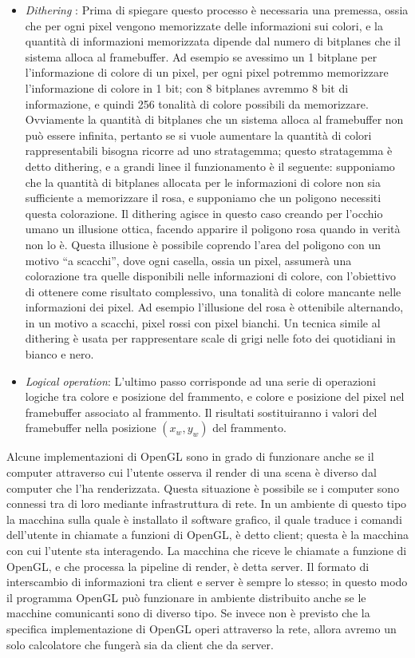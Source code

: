 \begin{itemize}
\item \emph{Dithering} : Prima di spiegare questo processo è necessaria una premessa, ossia che per ogni pixel vengono memorizzate delle informazioni sui colori, e la quantità di informazioni memorizzata dipende dal numero di bitplanes che il sistema alloca al framebuffer. Ad esempio se avessimo un 1 bitplane per l’informazione di colore di un pixel, per ogni pixel potremmo memorizzare l’informazione di colore in 1 bit; con 8 bitplanes avremmo 8 bit di informazione, e quindi 256 tonalità di colore possibili da memorizzare. Ovviamente la quantità di bitplanes che un sistema alloca al framebuffer non può essere infinita, pertanto se si vuole aumentare la quantità di colori rappresentabili bisogna ricorre ad uno stratagemma; questo stratagemma è detto dithering, e a grandi linee il funzionamento è il seguente: supponiamo che la quantità di bitplanes allocata per le informazioni di colore non sia sufficiente a memorizzare il rosa, e supponiamo che un poligono necessiti questa colorazione. Il dithering agisce in questo caso creando per l’occhio umano un illusione ottica, facendo apparire il poligono rosa quando in verità non lo è. Questa illusione è possibile coprendo l’area del poligono con un motivo “a scacchi”, dove ogni casella, ossia un pixel, assumerà una colorazione tra quelle disponibili nelle informazioni di colore, con l’obiettivo di ottenere come risultato complessivo, una tonalità di colore mancante nelle informazioni dei pixel. Ad esempio l’illusione del rosa è ottenibile alternando, in un motivo a scacchi, pixel rossi con pixel bianchi. Un tecnica simile al dithering è usata per rappresentare scale di grigi nelle foto dei quotidiani in bianco e nero.
\item \emph{Logical operation}: L’ultimo passo corrisponde ad una serie di operazioni logiche tra colore e posizione del frammento, e colore e posizione del pixel nel framebuffer associato al frammento. Il risultati sostituiranno i valori del framebuffer nella posizione $(x_w,y_w)$ del frammento.
\end{itemize}

Alcune implementazioni di OpenGL sono in grado di funzionare anche se il computer attraverso cui l’utente osserva il render di una scena è diverso dal computer che l’ha renderizzata.
Questa situazione è possibile se i computer sono connessi tra di loro mediante infrastruttura di rete.
In un ambiente di questo tipo la macchina sulla quale è installato il software grafico, il quale traduce i comandi dell’utente in chiamate a funzioni di OpenGL, è detto client; questa è la macchina con cui l’utente sta interagendo. La macchina che riceve le chiamate a funzione di OpenGL, e che processa la pipeline di render, è detta server. Il formato di interscambio di informazioni tra client e server è sempre lo stesso; in questo modo il programma OpenGL può funzionare in ambiente distribuito anche se le macchine comunicanti sono di diverso tipo. Se invece non è previsto che la specifica implementazione di OpenGL operi attraverso la rete, allora avremo un solo calcolatore che fungerà sia da client che da server.
